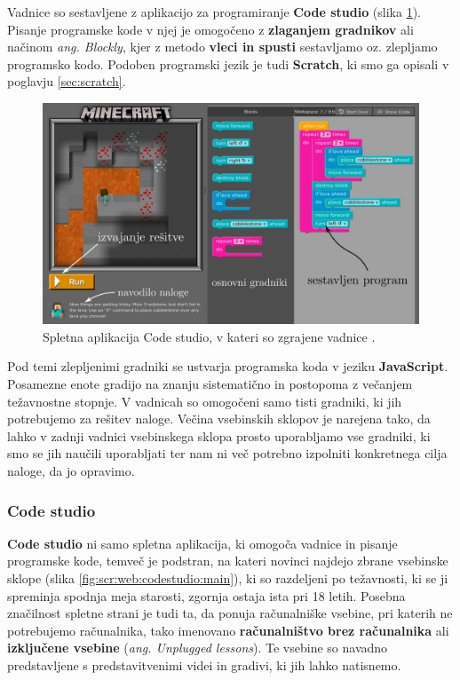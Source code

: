 Vadnice so sestavljene z aplikacijo za programiranje \textbf{Code
  studio} (slika \ref{fig:scr:web:codestudio}). Pisanje programske
kode v njej je omogočeno z \textbf{zlaganjem gradnikov} ali načinom
\emph{ang. Blockly}, kjer z metodo \textbf{vleci in spusti}
sestavljamo oz. zlepljamo programsko kodo. Podoben programski jezik je
tudi \textbf{Scratch}, ki smo ga opisali v poglavju
\ref{sec:scratch}.

\begin{figure}[h!]
  \centering
    \includegraphics [width=0.65\linewidth, keepaspectratio =
    1] {./images/sc_web/code_cstudiov01.jpg}
    \caption{Spletna aplikacija Code studio, v kateri so zgrajene
      vadnice \cite{web:code.org}.}
    \label{fig:scr:web:codestudio}
\end{figure}

Pod temi zlepljenimi gradniki se ustvarja programska koda v jeziku
\textbf{JavaScript}. Posamezne enote gradijo na znanju sistematično in
postopoma z večanjem težavnostne stopnje. V vadnicah so omogočeni samo
tisti gradniki, ki jih potrebujemo za rešitev naloge. Večina vsebinskih
sklopov je narejena tako, da lahko v zadnji vadnici vsebinskega sklopa 
prosto uporabljamo vse gradniki, ki smo se jih naučili uporabljati ter
nam ni več potrebno izpolniti konkretnega cilja naloge, da jo
opravimo.

\subsubsection{Code studio}
\label{sec:code-studio}

\textbf{Code studio} ni samo spletna aplikacija, ki omogoča vadnice in
pisanje programske kode, temveč je podstran, na kateri novinci najdejo
zbrane vsebinske sklope (slika \ref{fig:scr:web:codestudio:main}), ki so
razdeljeni po težavnosti, ki se ji spreminja spodnja meja starosti,
zgornja ostaja ista pri 18 letih. Posebna značilnost spletne strani je
tudi ta, da ponuja računalniške vsebine, pri katerih ne potrebujemo
računalnika, tako imenovano \textbf{računalništvo brez računalnika}
ali \textbf{izključene vsebine} (\emph{ang. Unplugged lessons}). Te
vsebine so navadno predstavljene s predstavitvenimi videi in gradivi,
ki jih lahko natisnemo. 


